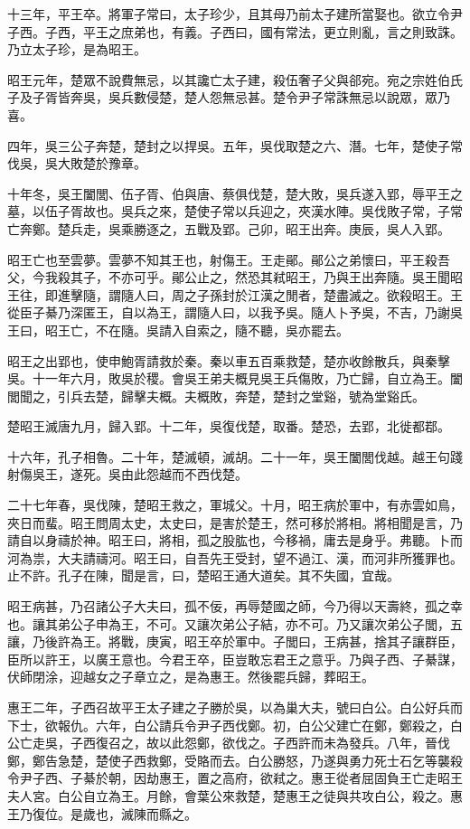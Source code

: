 十三年，平王卒。將軍子常曰，太子珍少，且其母乃前太子建所當娶也。欲立令尹子西。子西，平王之庶弟也，有義。子西曰，國有常法，更立則亂，言之則致誅。乃立太子珍，是為昭王。

昭王元年，楚眾不說費無忌，以其讒亡太子建，殺伍奢子父與郤宛。宛之宗姓伯氏子及子胥皆奔吳，吳兵數侵楚，楚人怨無忌甚。楚令尹子常誅無忌以說眾，眾乃喜。

四年，吳三公子奔楚，楚封之以捍吳。五年，吳伐取楚之六、潛。七年，楚使子常伐吳，吳大敗楚於豫章。

十年冬，吳王闔閭、伍子胥、伯與唐、蔡俱伐楚，楚大敗，吳兵遂入郢，辱平王之墓，以伍子胥故也。吳兵之來，楚使子常以兵迎之，夾漢水陣。吳伐敗子常，子常亡奔鄭。楚兵走，吳乘勝逐之，五戰及郢。己卯，昭王出奔。庚辰，吳人入郢。

昭王亡也至雲夢。雲夢不知其王也，射傷王。王走鄖。鄖公之弟懷曰，平王殺吾父，今我殺其子，不亦可乎。鄖公止之，然恐其弒昭王，乃與王出奔隨。吳王聞昭王往，即進擊隨，謂隨人曰，周之子孫封於江漢之閒者，楚盡滅之。欲殺昭王。王從臣子綦乃深匿王，自以為王，謂隨人曰，以我予吳。隨人卜予吳，不吉，乃謝吳王曰，昭王亡，不在隨。吳請入自索之，隨不聽，吳亦罷去。

昭王之出郢也，使申鮑胥請救於秦。秦以車五百乘救楚，楚亦收餘散兵，與秦擊吳。十一年六月，敗吳於稷。會吳王弟夫概見吳王兵傷敗，乃亡歸，自立為王。闔閭聞之，引兵去楚，歸擊夫概。夫概敗，奔楚，楚封之堂谿，號為堂谿氏。

楚昭王滅唐九月，歸入郢。十二年，吳復伐楚，取番。楚恐，去郢，北徙都鄀。

十六年，孔子相魯。二十年，楚滅頓，滅胡。二十一年，吳王闔閭伐越。越王句踐射傷吳王，遂死。吳由此怨越而不西伐楚。

二十七年春，吳伐陳，楚昭王救之，軍城父。十月，昭王病於軍中，有赤雲如鳥，夾日而蜚。昭王問周太史，太史曰，是害於楚王，然可移於將相。將相聞是言，乃請自以身禱於神。昭王曰，將相，孤之股肱也，今移禍，庸去是身乎。弗聽。卜而河為祟，大夫請禱河。昭王曰，自吾先王受封，望不過江、漢，而河非所獲罪也。止不許。孔子在陳，聞是言，曰，楚昭王通大道矣。其不失國，宜哉。

昭王病甚，乃召諸公子大夫曰，孤不佞，再辱楚國之師，今乃得以天壽終，孤之幸也。讓其弟公子申為王，不可。又讓次弟公子結，亦不可。乃又讓次弟公子閭，五讓，乃後許為王。將戰，庚寅，昭王卒於軍中。子閭曰，王病甚，捨其子讓群臣，臣所以許王，以廣王意也。今君王卒，臣豈敢忘君王之意乎。乃與子西、子綦謀，伏師閉涂，迎越女之子章立之，是為惠王。然後罷兵歸，葬昭王。

惠王二年，子西召故平王太子建之子勝於吳，以為巢大夫，號曰白公。白公好兵而下士，欲報仇。六年，白公請兵令尹子西伐鄭。初，白公父建亡在鄭，鄭殺之，白公亡走吳，子西復召之，故以此怨鄭，欲伐之。子西許而未為發兵。八年，晉伐鄭，鄭告急楚，楚使子西救鄭，受賂而去。白公勝怒，乃遂與勇力死士石乞等襲殺令尹子西、子綦於朝，因劫惠王，置之高府，欲弒之。惠王從者屈固負王亡走昭王夫人宮。白公自立為王。月餘，會葉公來救楚，楚惠王之徒與共攻白公，殺之。惠王乃復位。是歲也，滅陳而縣之。

